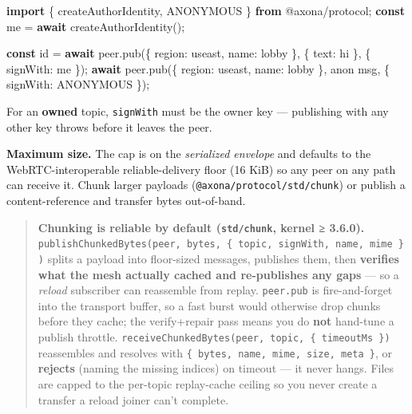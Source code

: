 \documentclass[
  nobib]{tufte-handout}
\newenvironment{Shaded}{}{}
\newcommand{\ControlFlowTok}[1]{\textcolor[rgb]{0.00,0.44,0.13}{\textbf{#1}}}
\newcommand{\DataTypeTok}[1]{\textcolor[rgb]{0.56,0.13,0.00}{#1}}
\newcommand{\FunctionTok}[1]{\textcolor[rgb]{0.02,0.16,0.49}{#1}}
\newcommand{\ImportTok}[1]{\textcolor[rgb]{0.00,0.50,0.00}{\textbf{#1}}}
\newcommand{\KeywordTok}[1]{\textcolor[rgb]{0.00,0.44,0.13}{\textbf{#1}}}
\newcommand{\NormalTok}[1]{#1}
\newcommand{\OperatorTok}[1]{\textcolor[rgb]{0.40,0.40,0.40}{#1}}
\newcommand{\StringTok}[1]{\textcolor[rgb]{0.25,0.44,0.63}{#1}}
\begin{document}
\begin{Shaded}
\begin{Highlighting}[]
\ImportTok{import}\NormalTok{ \{ createAuthorIdentity}\OperatorTok{,}\NormalTok{ ANONYMOUS \} }\ImportTok{from} \StringTok{\textquotesingle{}@axona/protocol\textquotesingle{}}\OperatorTok{;}
\KeywordTok{const}\NormalTok{ me }\OperatorTok{=} \ControlFlowTok{await} \FunctionTok{createAuthorIdentity}\NormalTok{()}\OperatorTok{;}

\KeywordTok{const}\NormalTok{ id }\OperatorTok{=} \ControlFlowTok{await}\NormalTok{ peer}\OperatorTok{.}\FunctionTok{pub}\NormalTok{(\{ }\DataTypeTok{region}\OperatorTok{:} \StringTok{\textquotesingle{}useast\textquotesingle{}}\OperatorTok{,} \DataTypeTok{name}\OperatorTok{:} \StringTok{\textquotesingle{}lobby\textquotesingle{}}\NormalTok{ \}}\OperatorTok{,}\NormalTok{ \{ }\DataTypeTok{text}\OperatorTok{:} \StringTok{\textquotesingle{}hi\textquotesingle{}}\NormalTok{ \}}\OperatorTok{,}\NormalTok{ \{ }\DataTypeTok{signWith}\OperatorTok{:}\NormalTok{ me \})}\OperatorTok{;}
\ControlFlowTok{await}\NormalTok{ peer}\OperatorTok{.}\FunctionTok{pub}\NormalTok{(\{ }\DataTypeTok{region}\OperatorTok{:} \StringTok{\textquotesingle{}useast\textquotesingle{}}\OperatorTok{,} \DataTypeTok{name}\OperatorTok{:} \StringTok{\textquotesingle{}lobby\textquotesingle{}}\NormalTok{ \}}\OperatorTok{,} \StringTok{\textquotesingle{}anon msg\textquotesingle{}}\OperatorTok{,}\NormalTok{ \{ }\DataTypeTok{signWith}\OperatorTok{:}\NormalTok{ ANONYMOUS \})}\OperatorTok{;}
\end{Highlighting}
\end{Shaded}

For an \textbf{owned} topic, \texttt{signWith} must be the owner key ---
publishing with any other key throws before it leaves the peer.

\textbf{Maximum size.} The cap is on the \emph{serialized envelope} and
defaults to the WebRTC-interoperable reliable-delivery floor (16 KiB) so
any peer on any path can receive it. Chunk larger payloads
(\texttt{@axona/protocol/std/chunk}) or publish a content-reference and
transfer bytes out-of-band.

\begin{quote}
\textbf{Chunking is reliable by default (\texttt{std/chunk}, kernel ≥
3.6.0).}
\texttt{publishChunkedBytes(peer,\ bytes,\ \{\ topic,\ signWith,\ name,\ mime\ \})}
splits a payload into floor-sized messages, publishes them, then
\textbf{verifies what the mesh actually cached and re-publishes any
gaps} --- so a \emph{reload} subscriber can reassemble from replay.
\texttt{peer.pub} is fire-and-forget into the transport buffer, so a
fast burst would otherwise drop chunks before they cache; the
verify+repair pass means you do \textbf{not} hand-tune a publish
throttle. \texttt{receiveChunkedBytes(peer,\ topic,\ \{\ timeoutMs\ \})}
reassembles and resolves with
\texttt{\{\ bytes,\ name,\ mime,\ size,\ meta\ \}}, or \textbf{rejects}
(naming the missing indices) on timeout --- it never hangs. Files are
capped to the per-topic replay-cache ceiling so you never create a
transfer a reload joiner can't complete.
\end{quote}
\end{document}
